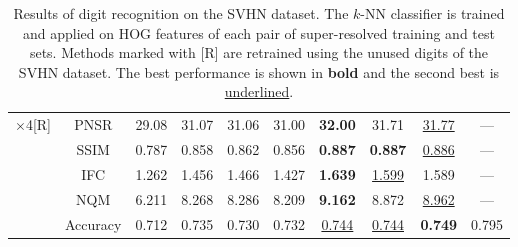 \documentclass[10pt,twocolumn,letterpaper]{article}
\begin{document}
\begin{table} [tb]
{\begin{tabular}{|l|c|ccccccc|c|}
  \hline   \hline
  $\times$4[R] & PNSR & 29.08 & 31.07 & 31.06 & 31.00 & \textbf{32.00} & 31.71 & \underline{31.77} & --- \\
  & SSIM & 0.787 & 0.858 & 0.862 & 0.856 & \textbf{0.887} & \textbf{0.887} & \underline{0.886} & --- \\
  & IFC & 1.262 & 1.456 & 1.466 & 1.427 & \textbf{1.639} & \underline{1.599} & 1.589 & --- \\
  & NQM & 6.211 & 8.268 & 8.286 & 8.209 & \textbf{9.162} & 8.872 & \underline{8.962} & --- \\   \hline
  & Accuracy & 0.712 & 0.735 & 0.730 & 0.732 & \underline{0.744} & \underline{0.744} & \textbf{0.749} & 0.795 \\
  \hline
\end{tabular}
}
\caption{Results of digit recognition on the SVHN dataset. 
The $k$-NN classifier is trained and applied on HOG features of each pair of super-resolved 
training and test sets. Methods marked with [R] are retrained using the unused digits of 
the SVHN dataset. The best performance is shown in \textbf{bold} and the second best is \underline{underlined}.}
\label{tab:dr}
\end{table}
\end{document}
